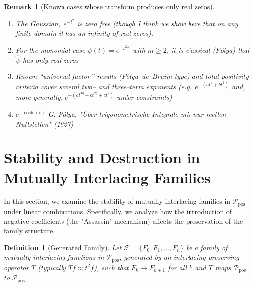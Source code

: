 \documentclass[11pt]{article}
\theoremstyle{breakdef}
\newtheorem{definition}[theorem]{Definition}
\newtheorem{remark}[theorem]{Remark}
\begin{document}
\begin{remark}[Known cases whose transform produces only real zeros]
\leavevmode
\begin{enumerate}[label=(\alph*)]
\item The Gaussian, $\,e^{-t^{2}}$ is zero free (though I think we show here that on any finite domain it has an infinity of real zeros).
\item For the monomial case $\psi(t)=e^{-t^{2m}}$ with $m\ge 2$, it is classical (Pólya) that $\widehat{\psi}$ has only real zeros
\item Known “universal factor’’ results (Pólya–de~Bruijn type) and total-positivity criteria cover several two– and three–term exponents (e.g.\ $e^{-(a t^{4}+b t^{2})}$ and, more generally, $e^{-(a t^{4q}+b t^{2q}+c t^{2})}$ under constraints)
\item $e^{-\cosh(t)}$
G. Pólya, "Über trigonometrische Integrale mit nur reellen Nullstellen" (1927)
\end{enumerate}
\end{remark}


\section{Stability and Destruction in Mutually Interlacing Families}

In this section, we examine the stability of mutually interlacing families in $\mathcal{P}_{\mathrm{pos}}$ under linear combinations. Specifically, we analyze how the introduction of negative coefficients (the "Assassin" mechanism) affects the preservation of the family structure.

\begin{definition}[Generated Family]
Let $\mathcal{F} = \{F_0, F_1, \dots, F_n\}$ be a family of mutually interlacing functions in $\mathcal{P}_{\mathrm{pos}}$, generated by an interlacing-preserving operator $T$ (typically $Tf \approx t^2 f$), such that $F_k \to F_{k+1}$ for all $k$ and $T$ maps $\mathcal{P}_{\mathrm{pos}}$ to $\mathcal{P}_{\mathrm{pos}}$
\end{definition}
\end{document}
